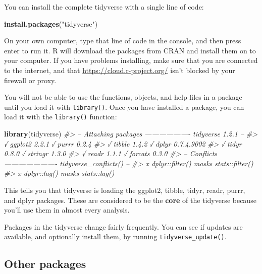 \documentclass[]{book}
\newenvironment{Shaded}{\begin{snugshade}}{\end{snugshade}}
\newcommand{\KeywordTok}[1]{\textcolor[rgb]{0.13,0.29,0.53}{\textbf{#1}}}
\newcommand{\StringTok}[1]{\textcolor[rgb]{0.31,0.60,0.02}{#1}}
\newcommand{\CommentTok}[1]{\textcolor[rgb]{0.56,0.35,0.01}{\textit{#1}}}
\newcommand{\NormalTok}[1]{#1}
\theoremstyle{definition}
\theoremstyle{definition}
\theoremstyle{definition}
\theoremstyle{remark}
\begin{document}
You can install the complete tidyverse with a single line of code:

\begin{Shaded}
\begin{Highlighting}[]
\KeywordTok{install.packages}\NormalTok{(}\StringTok{"tidyverse"}\NormalTok{)}
\end{Highlighting}
\end{Shaded}

On your own computer, type that line of code in the console, and then
press enter to run it. R will download the packages from CRAN and
install them on to your computer. If you have problems installing, make
sure that you are connected to the internet, and that
\url{https://cloud.r-project.org/} isn't blocked by your firewall or
proxy.

You will not be able to use the functions, objects, and help files in a
package until you load it with \texttt{library()}. Once you have
installed a package, you can load it with the \texttt{library()}
function:

\begin{Shaded}
\begin{Highlighting}[]
\KeywordTok{library}\NormalTok{(tidyverse)}
\CommentTok{#> -- Attaching packages ------------------- tidyverse 1.2.1 --}
\CommentTok{#> √ ggplot2 2.2.1          √ purrr   0.2.4     }
\CommentTok{#> √ tibble  1.4.2          √ dplyr   0.7.4.9002}
\CommentTok{#> √ tidyr   0.8.0          √ stringr 1.3.0     }
\CommentTok{#> √ readr   1.1.1          √ forcats 0.3.0}
\CommentTok{#> -- Conflicts ---------------------- tidyverse_conflicts() --}
\CommentTok{#> x dplyr::filter() masks stats::filter()}
\CommentTok{#> x dplyr::lag()    masks stats::lag()}
\end{Highlighting}
\end{Shaded}

This tells you that tidyverse is loading the ggplot2, tibble, tidyr,
readr, purrr, and dplyr packages. These are considered to be the
\textbf{core} of the tidyverse because you'll use them in almost every
analysis.

Packages in the tidyverse change fairly frequently. You can see if
updates are available, and optionally install them, by running
\texttt{tidyverse\_update()}.

\subsection{Other packages}\label{other-packages}
\end{document}
